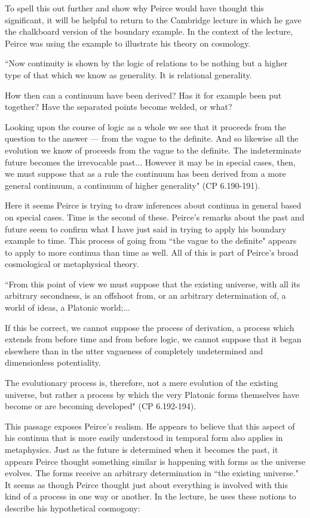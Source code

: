 \documentclass[12pt]{article}
\begin{document}
To spell this out further and show why Peirce would have thought this significant, it will be helpful to return to the Cambridge lecture in which he gave the chalkboard version of the boundary example. In the context of the lecture, Peirce was using the example to illustrate his theory on cosmology. 
\begin{singlespace}
``Now continuity is shown by the logic of relations to be nothing but a higher type of that which we know as generality. It is relational generality.

How then can a continuum have been derived? Has it for example been put together? Have the separated points become welded, or what?

Looking upon the course of logic as a whole we see that it proceeds from the question to the answer --- from the vague to the definite. And so likewise all the evolution we know of proceeds from the vague to the definite. The indeterminate future becomes the irrevocable past... However it may be in special cases, then, we must suppose that as a rule the continuum has been derived from a more general continuum, a continuum of higher generality" (CP 6.190-191).
\end{singlespace}
\noindent Here it seems Peirce is trying to draw inferences about continua in general based on special cases. Time is the second of these. Peirce's remarks about the past and future seem to confirm what I have just said in trying to apply his boundary example to time. This process of going from ``the vague to the definite" appears to apply to more continua than time as well. All of this is part of Peirce's broad cosmological or metaphysical theory.
\begin{singlespace}
``From this point of view we must suppose that the existing universe, with all its arbitrary secondness, is an offshoot from, or an arbitrary determination of, a world of ideas, a Platonic world;...

If this be correct, we cannot suppose the process of derivation, a process which extends from before time and from before logic, we cannot suppose that it began elsewhere than in the utter vagueness of completely undetermined and dimensionless potentiality.

The evolutionary process is, therefore, not a mere evolution of the existing universe, but rather a process by which the very Platonic forms themselves have become or are becoming developed" (CP 6.192-194).
\end{singlespace}
\noindent This passage exposes Peirce's realism. He appears to believe that this aspect of his continua that is more easily understood in temporal form also applies in metaphysics. Just as the future is determined when it becomes the past, it appears Peirce thought something similar is happening with forms as the universe evolves. The forms receive an arbitrary determination in ``the existing universe." It seems as though Peirce thought just about everything is involved with this kind of a process in one way or another. In the lecture, he uses these notions to describe his hypothetical cosmogony:
\end{document}
